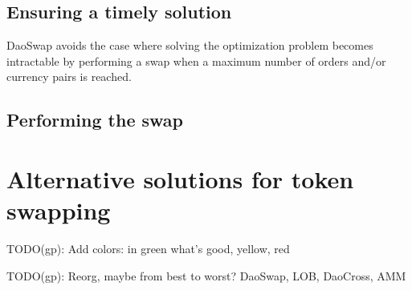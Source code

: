 \documentclass[11pt, reqno]{amsart}
\theoremstyle{definition}
\theoremstyle{remark}
\begin{document}
\subsection{Ensuring a timely solution}
DaoSwap avoids the case where solving the optimization problem becomes
intractable by performing a swap when a maximum number of orders and/or
currency pairs is reached.

\subsection{Performing the swap}


\section{Alternative solutions for token swapping}
\label{AlSoToSw}

TODO(gp): Add colors: in green what's good, yellow, red

TODO(gp): Reorg, maybe from best to worst? DaoSwap, LOB, DaoCross, AMM
\end{document}
